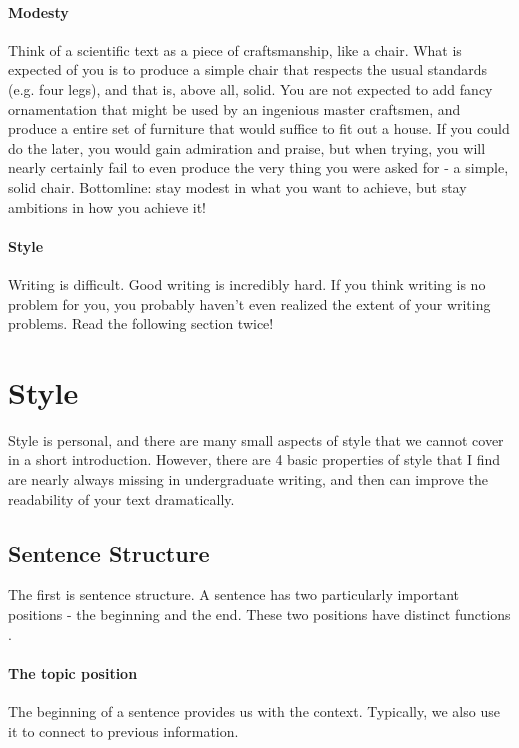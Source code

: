 \documentclass{tufte-book}
\begin{document}
\paragraph{Modesty} Think of a scientific text as a piece of craftsmanship, like a chair. What is expected of you is to produce a simple chair that respects the usual standards (e.g. four legs), and that is, above all, solid. You are not expected to add fancy ornamentation that might be used by an ingenious master craftsmen, and produce a entire set of furniture that would suffice to fit out a house. If you could do the later, you would gain admiration and praise, but when trying, you will nearly certainly fail to even produce the very thing you were asked for - a simple, solid chair. Bottomline: stay modest in what you want to achieve, but stay ambitions in how you achieve it!


\paragraph{Style} Writing is difficult. Good writing is incredibly hard. If you think writing is no problem for you, you probably haven't even realized the extent of your writing problems. Read the following section twice!


\section{Style}

Style is personal, and there are many small aspects of style that we cannot cover in a short introduction. However, there are 4 basic properties of style that I find are nearly always missing in undergraduate writing, and then can improve the readability of your text dramatically. 

\subsection{Sentence Structure}

The first is sentence structure. A sentence has two particularly important positions - the  beginning and the end. These two positions have distinct functions \citep{Gopen-ScienceOfScientific-1990,Tischler-Scientificwritingbooklet-1978}.

\paragraph{The topic position} The beginning of a sentence provides us with the context. Typically, we also use it to connect to previous information.
\end{document}
